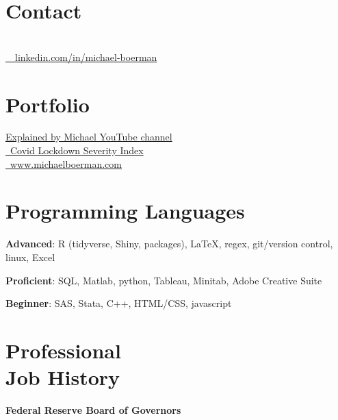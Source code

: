 \documentclass[margin,line]{res}
\begin{document}

\begin{resume}
\section{\sc Contact}

 \\
\faLinkedinIn  \href{https://www.linkedin.com/in/michael-boerman}{\ttfamily \, \, linkedin.com/in/michael-boerman}\\
\vspace{-.35cm}


\section{\sc Portfolio}
 \href{https://www.youtube.com/channel/UCxFMrMb6PrS7SOrQi-BfMUw/videos?view=0&sort=p&flow=grid}{ Explained by Michael YouTube channel}\\
\faChartLine \href{https://github.com/michaelboerman/lockdown_severity_index#readme}{\, Covid Lockdown Severity Index}\\
\faBriefcase \href{https://www.michaelboerman.com/}{\ttfamily  \, www.michaelboerman.com}\\
\vspace{-.35cm}

\section{\sc Programming Languages} 
{\bf Advanced}:  R (tidyverse, Shiny, packages), \LaTeX, regex, git/version control, linux, Excel
\vspace*{-3mm}

{\bf Proficient}: SQL, Matlab, python, Tableau, Minitab, Adobe Creative Suite
\vspace*{-3mm}

{\bf Beginner}:  SAS, Stata, C++, HTML/CSS, javascript

\section{\sc Professional \\ Job History}
{\bf Federal Reserve Board of Governors}\\


\end{resume}
\end{document}
